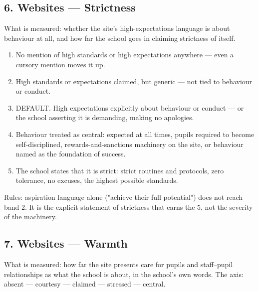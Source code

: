 \subsection*{6. Websites --- Strictness}
What is measured: whether the site's high-expectations language is about behaviour at all, and how far the school goes in claiming strictness of itself.

\begin{enumerate}
  \item No mention of high standards or high expectations anywhere --- even a cursory mention moves it up.
  \item High standards or expectations claimed, but generic --- not tied to behaviour or conduct.
  \item DEFAULT. High expectations explicitly about behaviour or conduct --- or the school asserting it is demanding, making no apologies.
  \item Behaviour treated as central: expected at all times, pupils required to become self-disciplined, rewards-and-sanctions machinery on the site, or behaviour named as the foundation of success.
  \item The school states that it is strict: strict routines and protocols, zero tolerance, no excuses, the highest possible standards.
\end{enumerate}
Rules: aspiration language alone ("achieve their full potential") does not reach band 2. It is the explicit statement of strictness that earns the 5, not the severity of the machinery.

\subsection*{7. Websites --- Warmth}
What is measured: how far the site presents care for pupils and staff--pupil relationships as what the school is about, in the school's own words. The axis: absent --- courtesy --- claimed --- stressed --- central.

